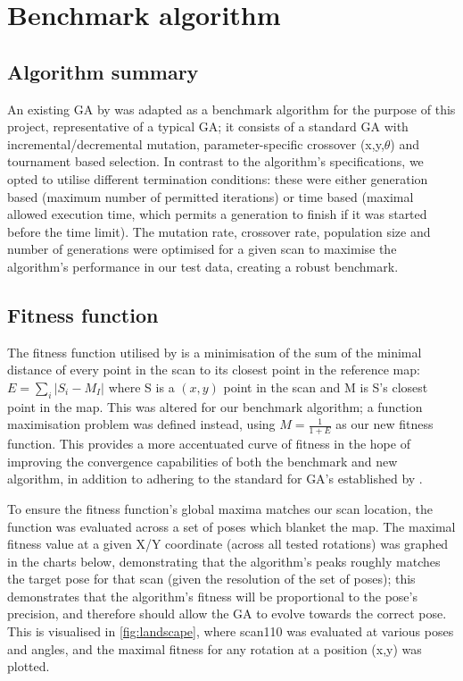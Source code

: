 \documentclass[authoryearcitations]{UoYCSproject}
\begin{document}
\chapter{Benchmark algorithm}
\section{Algorithm summary}
An existing GA by \citet{Robertson2002-ou} was adapted as a benchmark algorithm for the purpose of this project, representative of a typical GA; it consists of a standard GA with incremental/decremental mutation, parameter-specific crossover (x,y,$\theta$) and tournament based selection. In contrast to the algorithm's specifications, we opted to utilise different termination conditions: these were either generation based (maximum number of permitted iterations) or time based (maximal allowed execution time, which permits a generation to finish if it was started before the time limit). The mutation rate, crossover rate, population size and number of generations were optimised for a given scan to maximise the algorithm's performance in our test data, creating a robust benchmark.

\section{Fitness function}
\label{sec:fitness_landscape}
The fitness function utilised by \citet{Robertson2002-ou} is a minimisation of the sum of the minimal distance of every point in the scan to its closest point in the reference map: $E = \sum_i |S_i-M_I|$ where S is a $(x,y)$ point in the scan and M is S's closest point in the map. This was altered for our benchmark algorithm; a function maximisation problem was defined instead, using $M = \frac{1}{1+E}$ as our new fitness function. This provides a more accentuated curve of fitness in the hope of improving the convergence capabilities of both the benchmark and new algorithm, in addition to adhering to the standard for GA's established by \citet{Eiben2015-de}.

To ensure the fitness function's global maxima matches our scan location, the function was evaluated across a set of poses which blanket the map. The maximal fitness value at a given X/Y coordinate (across all tested rotations) was graphed in the charts below, demonstrating that the algorithm's peaks roughly matches the target pose for that scan (given the resolution of the set of poses); this demonstrates that the algorithm's fitness will be proportional to the pose's precision, and therefore should allow the GA to evolve towards the correct pose. This is visualised in \autoref{fig:landscape}, where scan110 was evaluated at various poses and angles, and the maximal fitness for any rotation at a position (x,y) was plotted.
\end{document}

